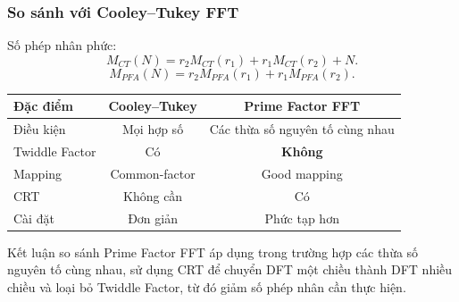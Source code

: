 \begin{frame}
\frametitle{So sánh với Cooley--Tukey FFT}


Số phép nhân phức:
\[
M_{CT}(N) = r_2 M_{CT}(r_1) + r_1 M_{CT}(r_2) + N.
\]
\[
M_{PFA}(N) = r_2 M_{PFA}(r_1) + r_1 M_{PFA}(r_2).
\]


\begin{table}
\centering
\begin{tabular}{|l|c|c|}
\hline
\textbf{Đặc điểm} & \textbf{Cooley--Tukey} & \textbf{Prime Factor FFT} \\
\hline
Điều kiện & Mọi hợp số & Các thừa số nguyên tố cùng nhau \\
\hline
Twiddle Factor & Có & \textbf{Không} \\
\hline
Mapping & Common-factor & Good mapping \\
\hline
CRT & Không cần & Có \\
\hline
Cài đặt & Đơn giản & Phức tạp hơn \\
\hline
\end{tabular}
\end{table}

\pause
\begin{block}{Kết luận so sánh}
Prime Factor FFT áp dụng  trong trường hợp các thừa số nguyên tố cùng nhau, sử dụng CRT để chuyển DFT một chiều thành DFT nhiều chiều và loại bỏ Twiddle Factor, từ đó giảm số phép nhân cần thực hiện.
\end{block}
\end{frame}


